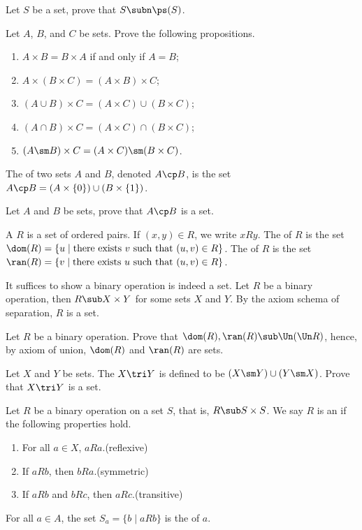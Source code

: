 \documentclass[10pt]{article}
\begin{document}
\begin{problem}
    Let $S$ be a set, prove that $S\subn\ps(S)$. 
\end{problem}
\begin{problem}
    Let $A$, $B$, and $C$ be sets. Prove the following propositions.
    \begin{enumerate}
        \item $A\times B=B\times A$ if and only if $A=B$;
        \item $A\times(B\times C)=(A\times B)\times C$;
        \item $(A\cup B)\times C=(A\times C)\cup(B\times C)$;
        \item $(A\cap B)\times C=(A\times C)\cap(B\times C)$;
        \item $(A\sm B)\times C=(A\times C)\sm(B\times C)$.
    \end{enumerate}
\end{problem}
\begin{definition}
    The  of two sets $A$ and $B$, denoted $A\cp B$, is the set $A\cp B=(A\times\{0\})\cup(B\times\{1\})$.
\end{definition}
\begin{problem}
    Let $A$ and $B$ be sets, prove that $A\cp B$ is a set.
\end{problem}
\begin{definition}
    A  $R$ is a set of ordered pairs. If $(x,y)\in R$, we write $xRy$. The  of $R$ is the set $\dom(R)=\{u\mid\text{there exists}\ v\ \text{such that}\ (u,v)\in R\}$. The  of $R$ is the set $\ran(R)=\{v\mid\text{there exists}\ u\ \text{such that}\ (u,v)\in R\}$. 
\end{definition}
\par
It suffices to show a binary operation is indeed a set. Let $R$ be a binary operation, then $R\sub X\times Y$ for some sets $X$ and $Y$. By the axiom schema of separation, $R$ is a set. 
\begin{problem}
    Let $R$ be a binary operation. Prove that $\dom(R),\ran(R)\sub\Un(\Un R)$, hence, by axiom of union, $\dom(R)$ and $\ran(R)$ are sets.
\end{problem}
\begin{problem}
    Let $X$ and $Y$ be sets. The  $X\tri Y$ is defined to be $(X\sm Y)\cup(Y\sm X)$. Prove that $X\tri Y$ is a set.
\end{problem}
\begin{definition}
    Let $R$ be a binary operation on a set $S$, that is, $R\sub S\times S$. We say $R$ is an  if the following properties hold.
    \begin{enumerate}
        \item For all $a\in X$, $aRa$.\hfill(reflexive)
        \item If $aRb$, then $bRa$.\hfill(symmetric)
        \item If $aRb$ and $bRc$, then $aRc$.\hfill(transitive)
    \end{enumerate}
    For all $a\in A$, the set ${S}_{a}=\{b\mid aRb\}$ is the  of $a$. 
\end{definition}
\end{document}
